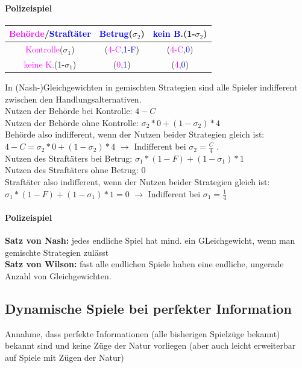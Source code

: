 \documentclass[11pt]{article}
\begin{document}
\paragraph{Polizeispiel}
\begin{center}
\begin{tabular}{c|c|c}
\textcolor{magenta}{Behörde}/\textcolor{blue}{Straftäter} & \textcolor{blue}{Betrug}(\(\sigma_{\text{2}}\)) & \textcolor{blue}{kein B.}(1-\(\sigma_{\text{2}}\))\\
\hline
\textcolor{magenta}{Kontrolle}(\(\sigma_{\text{1}}\)) & (\textcolor{magenta}{4-C},\textcolor{blue}{1-F}) & (\textcolor{magenta}{4-C},\textcolor{blue}{0})\\
\textcolor{magenta}{keine K.}(1-\(\sigma_{\text{1}}\)) & (\textcolor{magenta}{0},\textcolor{blue}{1}) & (\textcolor{magenta}{4},\textcolor{blue}{0})\\
\end{tabular}
\end{center}
In (Nash-)Gleichgewichten in gemischten Strategien sind alle Spieler indifferent zwischen den Handlungsalternativen.\\
Nutzen der Behörde bei Kontrolle: \(4-C\) \\
Nutzen der Behörde ohne Kontrolle: \(\sigma_2 * 0 + (1- \sigma_2)*4\) \\
Behörde also indifferent, wenn der Nutzen beider Strategien gleich ist:\\
\(4-C=\sigma_2 * 0 + (1- \sigma_2)*4\) \(\rightarrow\) Indifferent bei \(\sigma_2 = \frac{C}{4}\) .\\
\newline
Nutzen des Straftäters bei Betrug: \(\sigma_1 * (1-F) + (1-\sigma_1) * 1\) \\
Nutzen des Straftäters ohne Betrug: \(0\) \\
Straftäter also indifferent, wenn der Nutzen beider Strategien gleich ist:\\
\(\sigma_1 * (1-F) + (1-\sigma_1) * 1 = 0\) \(\rightarrow\) Indifferent bei \(\sigma_1 = \frac{1}{4}\)

\paragraph{Polizeispiel}
\textbf{Satz von Nash:} jedes endliche Spiel hat mind. ein GLeichgewicht, wenn man gemischte Strategien zulässt\\
\textbf{Satz von Wilson:} fast alle endlichen Spiele haben eine endliche, ungerade Anzahl von Gleichgewichten.
\subsection{Dynamische Spiele bei perfekter Information}
\label{sec:orgddfc6b6}
Annahme, dass perfekte Informationen (alle bisherigen Spielzüge bekannt) bekannt sind und keine Züge der Natur vorliegen (aber auch leicht erweiterbar auf Spiele mit Zügen der Natur)
\end{document}
